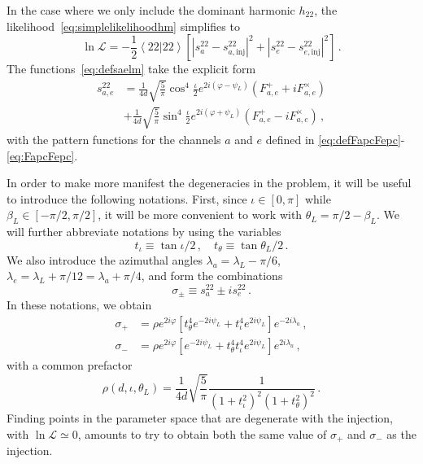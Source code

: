 \documentclass[aps,showpacs,twocolumn,prd,superscriptaddress,nofootinbib]{revtex4-1}
\newcommand{\be}{\begin{equation}}
\newcommand{\ee}{\end{equation}}
\newcommand{\bsub}{\begin{subequations}}
\newcommand{\esub}{\end{subequations}}
\newcommand\calL{{\mathcal{L}}}
\newcommand\psiL{{\psi_{L}}}
\begin{document}
In the case where we only include the dominant harmonic $h_{22}$, the likelihood~\eqref{eq:simplelikelihoodhm} simplifies to
\be\label{eq:simplelikelihood22}
	\ln \calL = -\frac{1}{2} \left\langle 22 | 22 \right\rangle  \left[ \left| s_{a}^{22} - s_{a, \mathrm{inj}}^{22} \right|^{2} + \left| s_{e}^{22} - s_{e, \mathrm{inj}}^{22}\right|^{2} \right] \,.
\ee
The functions~\eqref{eq:defsaelm} take the explicit form
\begin{align}
	s_{a,e}^{22} &= \frac{1}{4d} \sqrt{\frac{5}{\pi}} \cos^{4}\frac{\iota}{2} e^{2i(\varphi-\psiL)} \left( F_{a,e}^{+} + i F_{a,e}^{\times} \right) \\
	&+ \frac{1}{4d} \sqrt{\frac{5}{\pi}} \sin^{4}\frac{\iota}{2} e^{2i(\varphi+\psiL)} \left( F_{a,e}^{+} - i F_{a,e}^{\times} \right) \,,
\end{align}
with the pattern functions for the channels $a$ and $e$ defined in \eqref{eq:defFapcFepc}-\eqref{eq:FapcFepc}.

In order to make more manifest the degeneracies in the problem, it will be useful to introduce the following notations. First, since $\iota \in [0, \pi]$ while $\beta_{L} \in [-\pi/2, \pi/2]$, it will be more convenient to work with $\theta_{L} = \pi/2 - \beta_{L}$. We will further abbreviate notations by using the variables
\be
	t_{\iota} \equiv \tan \iota/2 \,, \quad t_{\theta} \equiv \tan \theta_{L} / 2 \,.
\ee
We also introduce the azimuthal angles $\lambda_{a} = \lambda_{L} - \pi/6$, $\lambda_{e} = \lambda_{L} + \pi/12 = \lambda_{a} + \pi/4$, and form the combinations
\be
	\sigma_{\pm} \equiv s_{a}^{22} \pm i s_{e}^{22} \,.
\ee
In these notations, we obtain
\bsub\label{eq:sigmapm}
\begin{align}
	\sigma_{+} &= \rho e^{2i\varphi} \left[ t_{\theta}^{4} e^{-2 i \psiL} + t_{\iota}^{4} e^{2 i \psiL} \right] e^{-2i \lambda_{a}} \,, \\
	\sigma_{-} &= \rho e^{2i\varphi} \left[ e^{-2 i \psiL} + t_{\theta}^{4} t_{\iota}^{4} e^{2 i \psiL} \right] e^{2i \lambda_{a}} \,,
\end{align}
\esub
with a common prefactor
\be\label{eq:sigmafactorrho}
	\rho(d, \iota, \theta_{L}) = \frac{1}{4d} \sqrt{\frac{5}{\pi}} \frac{1}{\left( 1 + t_{\iota}^{2} \right)^{2} \left(1 + t_{\theta}^{2} \right)^{2}} \,.
\ee
Finding points in the parameter space that are degenerate with the injection, with $\ln \calL \simeq 0$, amounts to try to obtain both the same value of $\sigma_{+}$ and $\sigma_{-}$ as the injection.
\end{document}

